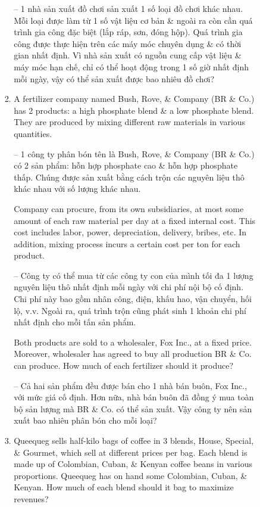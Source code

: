 \documentclass{article}
\begin{document}
\begin{itemize}
\begin{itemize}
\begin{itemize}
\begin{enumerate}
                -- 1 nhà sản xuất đồ chơi sản xuất 1 số loại đồ chơi khác nhau. Mỗi loại được làm từ 1 số vật liệu cơ bản \& ngoài ra còn cần quá trình gia công đặc biệt (lắp ráp, sơn, đóng hộp). Quá trình gia công được thực hiện trên các máy móc chuyên dụng \& có thời gian nhất định. Vì nhà sản xuất có nguồn cung cấp vật liệu \& máy móc hạn chế, chỉ có thể hoạt động trong 1 số giờ nhất định mỗi ngày, vậy có thể sản xuất được bao nhiêu đồ chơi?
                \item A fertilizer company named Bush, Rove, \& Company (BR \& Co.) has 2 products: a high phosphate blend \& a low phosphate blend. They are produced by mixing different raw materials in various quantities.

                -- 1 công ty phân bón tên là Bush, Rove, \& Company (BR \& Co.) có 2 sản phẩm: hỗn hợp phosphate cao \& hỗn hợp phosphate thấp. Chúng được sản xuất bằng cách trộn các nguyên liệu thô khác nhau với số lượng khác nhau.

                Company can procure, from its own subsidiaries, at most some amount of each raw material per day at a fixed internal cost. This cost includes labor, power, depreciation, delivery, bribes, etc. In addition, mixing process incurs a certain cost per ton for each product.

                -- Công ty có thể mua từ các công ty con của mình tối đa 1 lượng nguyên liệu thô nhất định mỗi ngày với chi phí nội bộ cố định. Chi phí này bao gồm nhân công, điện, khấu hao, vận chuyển, hối lộ, v.v. Ngoài ra, quá trình trộn cũng phát sinh 1 khoản chi phí nhất định cho mỗi tấn sản phẩm.

                Both products are sold to a wholesaler, Fox Inc., at a fixed price. Moreover, wholesaler has agreed to buy all production BR \& Co. can produce. How much of each fertilizer should it produce?

                -- Cả hai sản phẩm đều được bán cho 1 nhà bán buôn, Fox Inc., với mức giá cố định. Hơn nữa, nhà bán buôn đã đồng ý mua toàn bộ sản lượng mà BR \& Co. có thể sản xuất. Vậy công ty nên sản xuất bao nhiêu phân bón cho mỗi loại?
                \item Queequeg sells half-kilo bags of coffee in 3 blends, House, Special, \& Gourmet, which sell at different prices per bag. Each blend is made up of Colombian, Cuban, \& Kenyan coffee beans in various proportions. Queequeg has on hand some Colombian, Cuban, \& Kenyan. How much of each blend should it bag to maximize revenues?


\end{enumerate}
\end{itemize}
\end{itemize}
\end{itemize}
\end{document}
